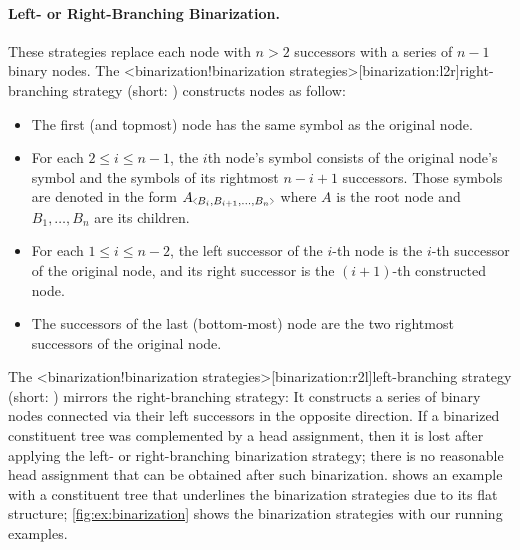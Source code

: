 \documentclass[../../document.tex]{subfiles}
\begin{document}
    \paragraph{Left- or Right-Branching Binarization.}
    These strategies replace each node with \( n>2 \) successors with a series of \( n-1 \) binary nodes.
    The <binarization!binarization strategies>[binarization:l2r]{right-branching strategy} (short: ) constructs nodes as follow:
    \begin{itemize}
        \item The first (and topmost) node has the same symbol as the original node.
        \item For each \(2 \leq i \leq n-1\), the \(i\)th node's symbol consists of the original node's symbol and the symbols of its rightmost \(n-i+1\) successors. Those symbols are denoted in the form \(A\binsym{B_i,B_{i+1},\ldots,B_n}\) where \(A\) is the root node and \(B_1, \ldots, B_n\) are its children.
        \item For each \(1 \leq i \leq n-2\), the left successor of the \(i\)-th node is the \(i\)-th successor of the original node, and its right successor is the \((i+1)\)-th constructed node.
        \item The successors of the last (bottom-most) node are the two rightmost successors of the original node.
    \end{itemize}
    The <binarization!binarization strategies>[binarization:r2l]{left-branching strategy} (short: ) mirrors the right-branching strategy: It constructs a series of binary nodes connected via their left successors in the opposite direction.
    If a binarized constituent tree was complemented by a head assignment, then it is lost after applying the left- or right-branching binarization strategy; there is no reasonable head assignment that can be obtained after such binarization.
     shows an example with a constituent tree that underlines the binarization strategies due to its flat structure; \cref{fig:ex:binarization} shows the binarization strategies with our running examples.
\end{document}
